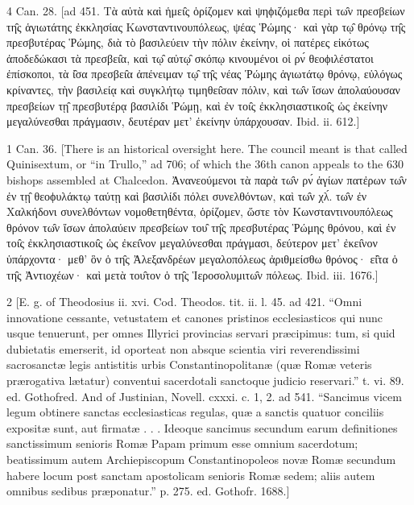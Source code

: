 4
Can. 28. [ad 451. Τὰ αὐτὰ καὶ ἡμει̑ς ὁρίζομεν καὶ ψηϕιζόμεθα περὶ τω̑ν πρεσβείων τη̑ς ἁγιωτάτης ἐκκλησίας Κωνσταντινουπόλεως, ψέας Ῥώμης· καὶ γὰρ τῳ̑ θρόνῳ τη̑ς πρεσβυτέρας Ῥώμης, διὰ τὸ βασιλεύειν τὴν πόλιν ἐκείνην, οἱ πατέρες εἰκότως ἀποδεδώκασι τὰ πρεσβει̑α, καὶ τῳ̑ αὐτῳ̑ σκόπῳ κινουμένοι οἱ ρν́ θεοϕιλέστατοι ἐπίσκοποι, τὰ ἰ̑σα πρεσβει̑α ἀπένειμαν τῳ̑ τη̑ς νέας Ῥώμης ἁγιωτάτῳ θρόνῳ, εὐλόγως κρίναντες, τὴν βασιλείᾳ καὶ συγκλήτῳ τιμηθει̑σαν πόλιν, καὶ τω̑ν ἴσων ἀπολαύουσαν πρεσβείων τῃ̑ πρεσβυτέρᾳ βασιλίδι Ῥώμῃ, καὶ ἐν τοι̑ς ἐκκλησιαστικοι̑ς ὡς ἐκείνην μεγαλύνεσθαι πράγμασιν, δευτέραν μετ’ ἐκείνην ὑπάρχουσαν. Ibid. ii. 612.]

1
Can. 36. [There is an historical oversight here. The council meant is that called Quinisextum, or “in Trullo,” ad 706; of which the 36th canon appeals to the 630 bishops assembled at Chalcedon. Ἀνανεούμενοι τὰ παρὰ τω̑ν ρν́ ἁγίων πατἐρων τω̑ν ἐν τῃ̑ θεοϕυλάκτῳ ταύτῃ καὶ βασιλίδι πόλει συνελθόντων, καὶ τω̑ν χλ́. τω̑ν ἐν Χαλκήδονι συνελθόντων νομοθετηθέντα, ὁρίζομεν, ὥστε τὸν Κωνσταντινουπόλεως θρόνον τω̑ν ἴσων ἀπολαύειν πρεσβείων του̑ τη̑ς πρεσβυτέρας Ῥώμης θρόνου, καὶ ἐν τοι̑ς ἐκκλησιαστικοι̑ς ὡς ἐκει̑νον μεγαλύνεσθαι πράγμασι, δεύτερον μετ’ ἐκει̑νον ὑπάρχοντα· μεθ’ ὃν ὁ τη̑ς Ἀλεξανδρέων μεγαλοπόλεως ἀριθμείσθω θρόνος· εἰ̑τα ὁ τη̑ς Ἀντιοχέων· καὶ μετὰ του̑τον ὁ τη̑ς Ἱεροσολυμιτω̑ν πόλεως. Ibid. iii. 1676.]

2
[E. g. of Theodosius ii. xvi. Cod. Theodos. tit. ii. l. 45. ad 421. “Omni innovatione cessante, vetustatem et canones pristinos ecclesiasticos qui nunc usque tenuerunt, per omnes Illyrici provincias servari præcipimus: tum, si quid dubietatis emerserit, id oporteat non absque scientia viri reverendissimi sacrosanctæ legis antistitis urbis Constantinopolitanæ (quæ Romæ veteris prærogativa lætatur) conventui sacerdotali sanctoque judicio reservari.” t. vi. 89. ed. Gothofred. And of Justinian, Novell. cxxxi. c. 1, 2. ad 541. “Sancimus vicem legum obtinere sanctas ecclesiasticas regulas, quæ a sanctis quatuor conciliis expositæ sunt, aut firmatæ . . . Ideoque sancimus secundum earum definitiones sanctissimum senioris Romæ Papam primum esse omnium sacerdotum; beatissimum autem Archiepiscopum Constantinopoleos novæ Romæ secundum habere locum post sanctam apostolicam senioris Romæ sedem; aliis autem omnibus sedibus præponatur.” p. 275. ed. Gothofr. 1688.]


